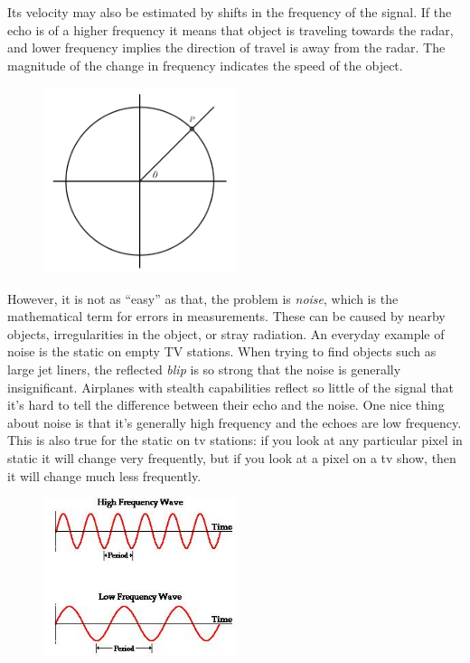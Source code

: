 Its velocity may also be estimated by shifts in the frequency of the signal. If the echo is of a higher frequency it means that object is traveling towards the radar, and lower frequency implies the direction of travel is away from the radar. The magnitude of the change in frequency indicates the speed of the object.


	\begin{figure}[H]
	\centering
	\includegraphics[width=0.5\textwidth]{../sections/seasons/season1/112/images/circle.png} 
	\end{figure}


However, it is not as ``easy'' as that, the problem is \emph{noise}, which is the mathematical term for errors in measurements. These can be caused by nearby objects, irregularities in the object, or stray radiation. An everyday example of noise is the static on empty TV stations. When trying to find objects such as large jet liners, the reflected \emph{blip} is so strong that the noise is generally insignificant. Airplanes with stealth capabilities reflect so little of the signal that it's hard to tell the difference between their echo and the noise. One nice thing about noise is that it's generally high frequency and the echoes are low frequency. This is also true for the static on tv stations: if you look at any particular pixel in static it will change very frequently, but if you look at a pixel on a tv show, then it will change much less frequently.


	\begin{figure}[H]
	\centering
	\includegraphics[width=0.5\textwidth]{../sections/seasons/season1/112/images/hilow.jpg} 
	\end{figure}


